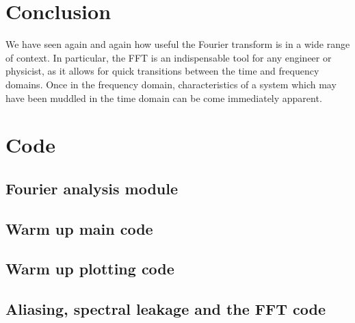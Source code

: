 \documentclass[twocolumn]{myarticle}
\begin{document}
\section{Conclusion}
\label{sec:conclusion}

We have seen again and again how useful the Fourier transform is in a wide range of context.
In particular, the FFT is an indispensable tool for any engineer or physicist, as it allows for quick transitions between the time and frequency domains.
Once in the frequency domain, characteristics of a system which may have been muddled in the time domain can be come immediately apparent.

\onecolumn

\section{Code}
\label{sec:code}

\subsection{Fourier analysis module}
\label{subsec:fourier_analysis_module}


\vspace{10pt}

\subsection{Warm up main code}
\label{subsec:warm_up_main_code}


\vspace{10pt}

\subsection{Warm up plotting code}
\label{subsec:warm_up_plotting_code}


\vspace{10pt}

\subsection{Aliasing, spectral leakage and the FFT code}
\label{subsec:aliasing_spectral_leakage_and_the_fft_code}


\vspace{10pt}
\end{document}
